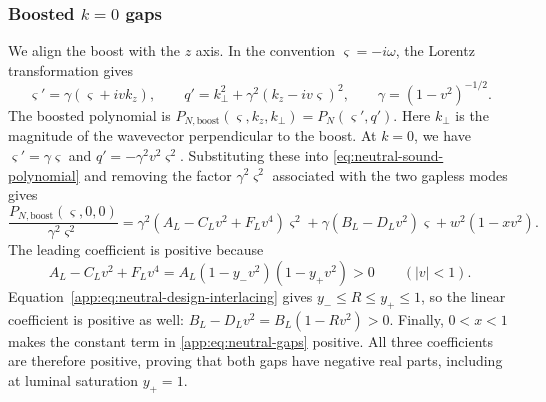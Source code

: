 \subsubsection*{Boosted $k=0$ gaps}
We align the boost with the $z$ axis. In the convention
$\varsigma=-i\omega$, the Lorentz transformation gives
\begin{equation}\label{app:eq:neutral-boost}
 \varsigma'=\gamma(\varsigma+ivk_z),\qquad
 q'=k_\perp^2+\gamma^2(k_z-iv\varsigma)^2,\qquad
 \gamma=(1-v^2)^{-1/2}.
\end{equation}
The boosted polynomial is $P_{N,\mathrm{boost}}(\varsigma,k_z,k_\perp)=P_N(\varsigma',q')$.
Here $k_\perp$ is the magnitude of the wavevector perpendicular to the
boost. At $k=0$, we have $\varsigma'=\gamma\varsigma$ and
$q'=-\gamma^2v^2\varsigma^2$. Substituting these into
\eqref{eq:neutral-sound-polynomial} and removing the factor
$\gamma^2\varsigma^2$ associated with the two gapless modes gives
\begin{equation}\label{app:eq:neutral-gaps}
 \frac{P_{N,\mathrm{boost}}(\varsigma,0,0)}{\gamma^2\varsigma^2}
 =\gamma^2(A_L-C_Lv^2+F_Lv^4)\varsigma^2
 +\gamma(B_L-D_Lv^2)\varsigma+w^2(1-xv^2).
\end{equation}
The leading coefficient is positive because
\begin{equation}\label{app:eq:neutral-leading}
 A_L-C_Lv^2+F_Lv^4
       =A_L(1-y_-v^2)(1-y_+v^2)>0\qquad (|v|<1).
\end{equation}
Equation~\eqref{app:eq:neutral-design-interlacing} gives
$y_-\leq R\leq y_+\leq1$, so the linear coefficient is positive as well:
$B_L-D_Lv^2=B_L(1-Rv^2)>0$. Finally, $0<x<1$ makes the constant term in
\eqref{app:eq:neutral-gaps} positive. All three coefficients
are therefore positive, proving that both gaps have negative real parts,
including at luminal saturation $y_+=1$.

